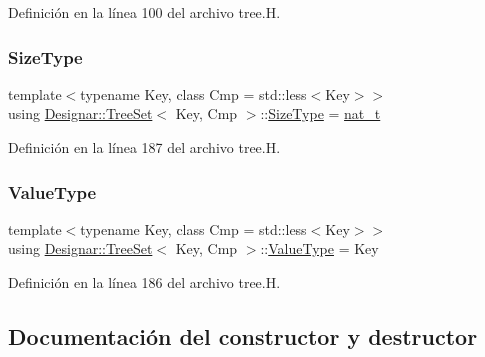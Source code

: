 Definición en la línea 100 del archivo tree.\+H.

\mbox{\label{class_designar_1_1_tree_set_a9a4926aa5faab169012a173c8cf5e4bb}} 
\subsubsection{\texorpdfstring{Size\+Type}{SizeType}}
{\footnotesize\ttfamily template$<$typename Key, class Cmp = std\+::less$<$\+Key$>$$>$ \\
using \hyperlink{class_designar_1_1_tree_set}{Designar\+::\+Tree\+Set}$<$ Key, Cmp $>$\+::\hyperlink{class_designar_1_1_tree_set_a9a4926aa5faab169012a173c8cf5e4bb}{Size\+Type} =  \hyperlink{namespace_designar_aa72662848b9f4815e7bf31a7cf3e33d1}{nat\+\_\+t}}



Definición en la línea 187 del archivo tree.\+H.

\mbox{\label{class_designar_1_1_tree_set_ab913d8de65b88abb61139cc3880ffe2d}} 
\subsubsection{\texorpdfstring{Value\+Type}{ValueType}}
{\footnotesize\ttfamily template$<$typename Key, class Cmp = std\+::less$<$\+Key$>$$>$ \\
using \hyperlink{class_designar_1_1_tree_set}{Designar\+::\+Tree\+Set}$<$ Key, Cmp $>$\+::\hyperlink{class_designar_1_1_tree_set_ab913d8de65b88abb61139cc3880ffe2d}{Value\+Type} =  Key}



Definición en la línea 186 del archivo tree.\+H.



\subsection{Documentación del constructor y destructor}
\mbox{\label{class_designar_1_1_tree_set_a188c4a4093595878dba7e38b249cb024}} 
